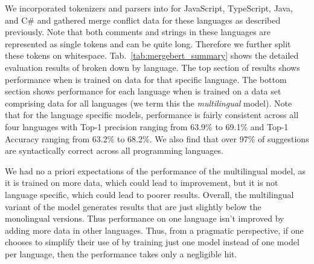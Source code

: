 We incorporated tokenizers and parsers into \thistool{} for JavaScript, TypeScript, Java, and C\# and gathered merge conflict data for these languages as described previously.  
Note that both comments and strings in these languages are represented as single tokens and can be quite long.  
Therefore we further split these tokens on whitespace.
Tab.~\ref{tab:mergebert_summary} shows the detailed evaluation results of \thistool{} broken down by language. The top section of results shows performance when \thistool{} is trained on data for that specific language.  
The bottom section shows performance for each language when \thistool{} is trained on a data set comprising data for all languages (we term this the \emph{multilingual} model).
Note that for the language specific models, performance is fairly consistent across all four languages with Top-1 precision ranging from 63.9\% to 69.1\% and Top-1 Accuracy ranging from 63.2\% to 68.2\%. We also find that over 97\% of \thistool{} suggestions are syntactically correct across all programming languages. 

We had no a priori expectations of the performance of the multilingual model, as it is trained on more data, which could lead to improvement, but it is not language specific, which could lead to poorer results.
Overall, the multilingual variant of the model generates results that are just slightly below the monolingual versions.
Thus performance on one language isn't improved by adding more data in other languages.
Thus, from a pragmatic perspective, if one chooses to simplify their use of \thistool{} by training just one model instead of one model per language, then the performance takes only a negligible hit.



